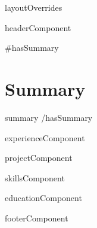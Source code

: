 \documentclass[letterpaper,10pt]{article}
\begin{document}
{{{layoutOverrides}}}

{{{headerComponent}}}

{{#hasSummary}}
\section{Summary}
\vspace{1pt}
\small{
  {{summary}}
}
{{/hasSummary}}

{{{experienceComponent}}}

{{{projectComponent}}}

{{{skillsComponent}}}

{{{educationComponent}}}

{{{footerComponent}}}
\end{document}
